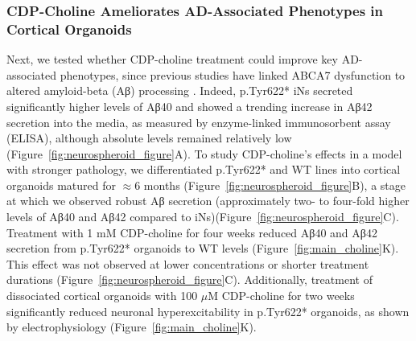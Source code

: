 \subsubsection{CDP-Choline Ameliorates AD-Associated Phenotypes in Cortical Organoids}
Next, we tested whether CDP-choline treatment could improve key AD-associated phenotypes, since previous studies have linked ABCA7 dysfunction to altered amyloid-beta (Aβ) processing \cite{Satoh2015-yu,Sakae2016-uy,Bamji-Mirza2018-xt,Chan2008-qu,De_Roeck2018-fw}. Indeed, p.Tyr622* iNs secreted significantly higher levels of Aβ40 and showed a trending increase in Aβ42 secretion into the media, as measured by enzyme-linked immunosorbent assay (ELISA), although absolute levels remained relatively low (Figure~\ref{fig:neurospheroid_figure}A). To study CDP-choline's effects in a model with stronger pathology, we differentiated p.Tyr622* and WT lines into cortical organoids matured for $\approx 6$ months (Figure~\ref{fig:neurospheroid_figure}B), a stage at which we observed robust Aβ secretion (approximately two- to four-fold higher levels of Aβ40 and Aβ42 compared to iNs)(Figure~\ref{fig:neurospheroid_figure}C). Treatment with 1 mM CDP-choline for four weeks reduced Aβ40 and Aβ42 secretion from p.Tyr622* organoids to WT levels (Figure~\ref{fig:main_choline}K). This effect was not observed at lower concentrations or shorter treatment durations (Figure~\ref{fig:neurospheroid_figure}C). Additionally, treatment of dissociated cortical organoids with 100 $\mu$M CDP-choline for two weeks significantly reduced neuronal hyperexcitability in p.Tyr622* organoids, as shown by electrophysiology (Figure~\ref{fig:main_choline}K).

